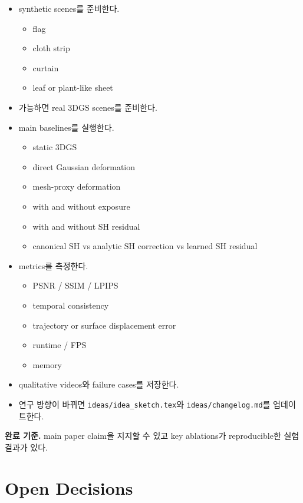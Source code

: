 \documentclass[10pt]{article}
\newcommand{\code}[1]{\texttt{#1}}
\begin{document}
\begin{itemize}
  \item synthetic scenes를 준비한다.
    \begin{itemize}
      \item flag
      \item cloth strip
      \item curtain
      \item leaf or plant-like sheet
    \end{itemize}
  \item 가능하면 real 3DGS scenes를 준비한다.
  \item main baselines를 실행한다.
    \begin{itemize}
      \item static 3DGS
      \item direct Gaussian deformation
      \item mesh-proxy deformation
      \item with and without exposure
      \item with and without SH residual
      \item canonical SH vs analytic SH correction vs learned SH residual
    \end{itemize}
  \item metrics를 측정한다.
    \begin{itemize}
      \item PSNR / SSIM / LPIPS
      \item temporal consistency
      \item trajectory or surface displacement error
      \item runtime / FPS
      \item memory
    \end{itemize}
  \item qualitative videos와 failure cases를 저장한다.
  \item 연구 방향이 바뀌면 \code{ideas/idea\_sketch.tex}와 \code{ideas/changelog.md}를 업데이트한다.
\end{itemize}

\textbf{완료 기준.} main paper claim을 지지할 수 있고 key ablations가 reproducible한 실험 결과가 있다.

\section*{Open Decisions}
\end{document}
